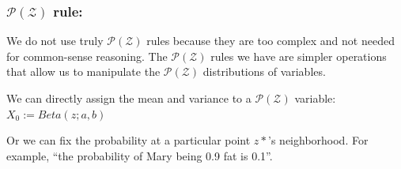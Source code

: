 \documentclass[a4paper]{report}
\begin{document}
\subsubsection{$\mathcal{P(Z)}$ rule:}

We do not use truly $\mathcal{P(Z)}$ rules because they are too complex and not needed for common-sense reasoning.  The $\mathcal{P(Z)}$ rules we have are simpler operations that allow us to manipulate the $\mathcal{P(Z)}$ distributions of variables.

We can directly assign the mean and variance to a $\mathcal{P(Z)}$ variable:\\
\hspace*{1cm} $X_0 := Beta(z; a, b)$

Or we can fix the probability at a particular point $z*$'s neighborhood.  For example, ``the probability of Mary being 0.9 fat is 0.1''.


%

%
\end{document}
